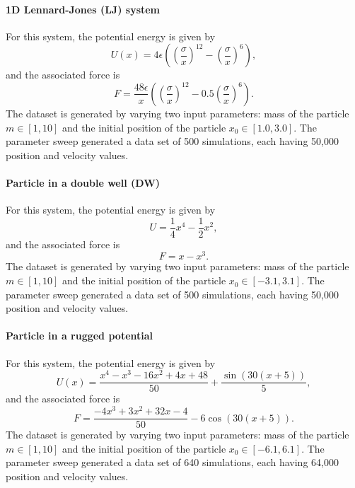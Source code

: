 \documentclass[aps,prl,twocolumn,superscriptaddress,tightenlines,longbibliography, reprint]{revtex4-1}
\begin{document}
\paragraph{1D Lennard-Jones (LJ) system}
For this system, the potential energy is given by
\begin{equation} \label{eq:data5}
U(x) = 4\epsilon \left(\left(\frac{\sigma}{x}\right)^{12} - \left(\frac{\sigma}{x}\right)^{6}\right),
\end{equation}
and the associated force is
\begin{equation} \label{eq:data6}
F =  \frac{48 \epsilon}{x} \left(\left(\frac{\sigma}{x}\right)^{12} - 0.5 \left(\frac{\sigma}{x}\right)^6 \right) .
\end{equation}
The dataset is generated by varying two input parameters: mass of the particle $m \in [1, 10]$ and the initial position of the particle  $x_0 \in [1.0, 3.0]$. The parameter sweep generated a data set of 500 simulations, each having 50,000 position and velocity values.
\paragraph{Particle in a double well (DW)}
For this system, the potential energy is given by
\begin{equation} \label{eq:data7}
U = \frac{1}{4}x^4 - \frac{1}{2}x^2,
\end{equation}
and the associated force is
\begin{equation} \label{eq:data8}
F = x - x^3.
\end{equation}
The dataset is generated by varying two input parameters: mass of the particle $m\in[1,10]$ and the initial position of the particle $x_0 \in [-3.1, 3.1]$. The parameter sweep generated a data set of 500 simulations, each having 50,000 position and velocity values.
\paragraph{Particle in a rugged potential}
For this system, the potential energy is given by
\begin{equation} \label{eq:data9}
U(x) = \frac{x^4 - x^3 - 16x^2 + 4x + 48}{50}
+ \frac{\sin{(30(x+5))}}{5},
\end{equation}
and the associated force is
\begin{equation} \label{eq:data10}
F = \frac{-4x^3 + 3x^2 + 32x - 4}{50} -6 \cos{(30(x+5))}.
\end{equation}
The dataset is generated by varying two input parameters: mass of the particle $m \in [1,10]$ and the initial position of the particle  $x_0\in [-6.1,6.1]$. The parameter sweep generated a data set of 640 simulations, each having 64,000 position and velocity values.
\end{document}
